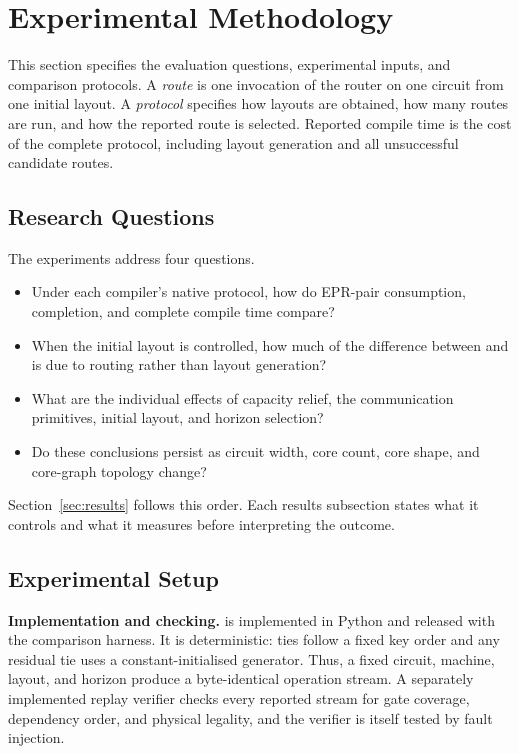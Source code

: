 \section{Experimental Methodology}
\label{sec:methodology}

This section specifies the evaluation questions, experimental inputs, and
comparison protocols. A \emph{route} is one invocation of the router on one
circuit from one initial layout. A \emph{protocol} specifies how layouts are
obtained, how many routes are run, and how the reported route is selected.
Reported compile time is the cost of the complete protocol, including layout
generation and all unsuccessful candidate routes.

\subsection{Research Questions}
\label{sec:rqs}

The experiments address four questions.
\begin{itemize}[leftmargin=1.6em,itemsep=1pt,topsep=2pt]
\item[\textbf{RQ1}] Under each compiler's native protocol, how do EPR-pair
consumption, completion, and complete compile time compare?
\item[\textbf{RQ2}] When the initial layout is controlled, how much of the
difference between \PORTER{} and \dSABRE{} is due to routing rather than
layout generation?
\item[\textbf{RQ3}] What are the individual effects of capacity relief, the
communication primitives, initial layout, and horizon selection?
\item[\textbf{RQ4}] Do these conclusions persist as circuit width, core
count, core shape, and core-graph topology change?
\end{itemize}

Section~\ref{sec:results} follows this order. Each results subsection states
what it controls and what it measures before interpreting the outcome.

\subsection{Experimental Setup}
\label{sec:setup}
\label{sec:perf}

\textbf{Implementation and checking.} \PORTER{} is implemented in Python
and released with the comparison harness. It is deterministic: ties follow a
fixed key order and any residual tie uses a constant-initialised generator.
Thus, a fixed circuit, machine, layout, and horizon produce a byte-identical
operation stream. A separately implemented replay verifier checks every
reported \PORTER{} stream for gate coverage, dependency order, and physical
legality, and the verifier is itself tested by fault injection.

